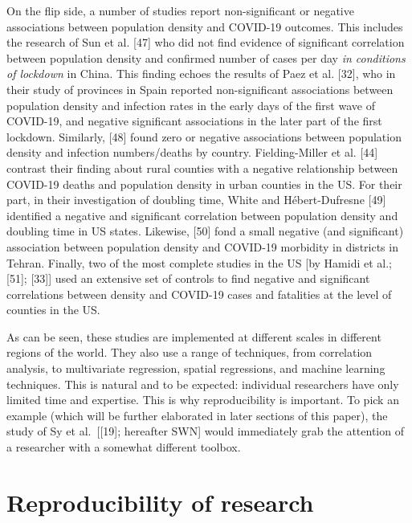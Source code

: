 \documentclass[10pt,letterpaper]{article}
\begin{document}
On the flip side, a number of studies report non-significant or negative
associations between population density and COVID-19 outcomes. This
includes the research of Sun et al. {[}47{]} who did not find evidence
of significant correlation between population density and confirmed
number of cases per day \emph{in conditions of lockdown} in China. This
finding echoes the results of Paez et al. {[}32{]}, who in their study
of provinces in Spain reported non-significant associations between
population density and infection rates in the early days of the first
wave of COVID-19, and negative significant associations in the later
part of the first lockdown. Similarly, {[}48{]} found zero or negative
associations between population density and infection numbers/deaths by
country. Fielding-Miller et al. {[}44{]} contrast their finding about
rural counties with a negative relationship between COVID-19 deaths and
population density in urban counties in the US. For their part, in their
investigation of doubling time, White and Hébert-Dufresne {[}49{]}
identified a negative and significant correlation between population
density and doubling time in US states. Likewise, {[}50{]} fond a small
negative (and significant) association between population density and
COVID-19 morbidity in districts in Tehran. Finally, two of the most
complete studies in the US {[}by Hamidi et al.; {[}51{]}; {[}33{]}{]}
used an extensive set of controls to find negative and significant
correlations between density and COVID-19 cases and fatalities at the
level of counties in the US.

As can be seen, these studies are implemented at different scales in
different regions of the world. They also use a range of techniques,
from correlation analysis, to multivariate regression, spatial
regressions, and machine learning techniques. This is natural and to be
expected: individual researchers have only limited time and expertise.
This is why reproducibility is important. To pick an example (which will
be further elaborated in later sections of this paper), the study of Sy
et al.~{[}{[}19{]}; hereafter SWN{]} would immediately grab the
attention of a researcher with a somewhat different toolbox.

\hypertarget{reproducibility-of-research}{%
\section{Reproducibility of
research}\label{reproducibility-of-research}}
\end{document}
